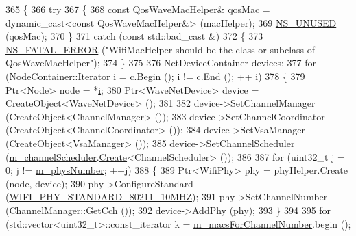 \begin{DoxyCode}
365 \{
366   \textcolor{keywordflow}{try}
367     \{
368       \textcolor{keyword}{const} QosWaveMacHelper& qosMac = \textcolor{keyword}{dynamic\_cast<}\textcolor{keyword}{const }QosWaveMacHelper&\textcolor{keyword}{>} (macHelper);
369       \hyperlink{unused_8h_a3ba03ad859378e9f01285afb60f0e3ab}{NS\_UNUSED} (qosMac);
370     \}
371   \textcolor{keywordflow}{catch} (\textcolor{keyword}{const} std::bad\_cast &)
372     \{
373       \hyperlink{group__fatal_ga5131d5e3f75d7d4cbfd706ac456fdc85}{NS\_FATAL\_ERROR} (\textcolor{stringliteral}{"WifiMacHelper should be the class or subclass of QosWaveMacHelper"});
374     \}
375 
376   NetDeviceContainer devices;
377   \textcolor{keywordflow}{for} (\hyperlink{classns3_1_1NodeContainer_aa1a9f2d2b09bfef7d066d3974bca2cc4}{NodeContainer::Iterator} \hyperlink{bernuolliDistribution_8m_a6f6ccfcf58b31cb6412107d9d5281426}{i} = \hyperlink{lte_2model_2fading-traces_2fading__trace__generator_8m_ae0323a9039add2978bf5b49550572c7c}{c}.Begin (); \hyperlink{bernuolliDistribution_8m_a6f6ccfcf58b31cb6412107d9d5281426}{i} != \hyperlink{lte_2model_2fading-traces_2fading__trace__generator_8m_ae0323a9039add2978bf5b49550572c7c}{c}.End (); ++
      \hyperlink{bernuolliDistribution_8m_a6f6ccfcf58b31cb6412107d9d5281426}{i})
378     \{
379       Ptr<Node> node = *\hyperlink{bernuolliDistribution_8m_a6f6ccfcf58b31cb6412107d9d5281426}{i};
380       Ptr<WaveNetDevice> device = CreateObject<WaveNetDevice> ();
381 
382       device->SetChannelManager (CreateObject<ChannelManager> ());
383       device->SetChannelCoordinator (CreateObject<ChannelCoordinator> ());
384       device->SetVsaManager (CreateObject<VsaManager> ());
385       device->SetChannelScheduler (\hyperlink{classns3_1_1WaveHelper_ac4708368922b43b2f61a8cdadd9e3b5b}{m\_channelScheduler}.\hyperlink{classns3_1_1ObjectFactory_a18152e93f0a6fe184ed7300cb31e9896}{Create}<ChannelScheduler> ());
386 
387       \textcolor{keywordflow}{for} (uint32\_t j = 0; j != \hyperlink{classns3_1_1WaveHelper_a34634d5d3480ffdd4b9ecaa375d2888f}{m\_physNumber}; ++j)
388         \{
389           Ptr<WifiPhy> phy = phyHelper.Create (node, device);
390           phy->ConfigureStandard (\hyperlink{group__wifi_gga1299834f4e1c615af3ca738033b76a49aff863c98db467eb76170dc8bbe743de7}{WIFI\_PHY\_STANDARD\_80211\_10MHZ});
391           phy->SetChannelNumber (\hyperlink{classns3_1_1ChannelManager_adbf5775f7d647b14c14fdcdbb00f67d0}{ChannelManager::GetCch} ());
392           device->AddPhy (phy);
393         \}
394 
395       \textcolor{keywordflow}{for} (std::vector<uint32\_t>::const\_iterator k = \hyperlink{classns3_1_1WaveHelper_a2c3c091a1b0d1b3f901e33d2849fe817}{m\_macsForChannelNumber}.begin ();

\end{DoxyCode}
